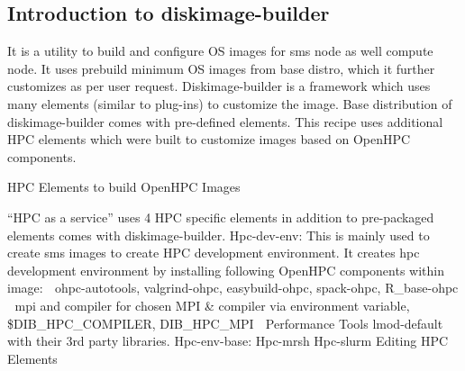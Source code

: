 \documentclass[12pt]{article}
\begin{document}
\subsection{Introduction to diskimage-builder}

It is a utility to build and configure OS images for sms node as well compute node. It uses prebuild minimum OS images from base distro, which it further customizes as per user request. Diskimage-builder is a framework which uses many elements (similar to plug-ins) to customize the image. Base distribution of diskimage-builder comes with pre-defined elements. This recipe uses additional HPC elements which were built to customize images based on OpenHPC components.

HPC Elements to build OpenHPC Images

“HPC as a service” uses 4 HPC specific elements in addition to pre-packaged elements comes with diskimage-builder.
Hpc-dev-env: This is mainly used to create sms images to create HPC development environment. It creates hpc development environment by installing following OpenHPC components within image: 
	ohpc-autotools, valgrind-ohpc, easybuild-ohpc, spack-ohpc, R\_base-ohpc
	mpi and compiler for chosen MPI \& compiler via environment variable, \$DIB\_HPC\_COMPILER, DIB\_HPC\_MPI
	Performance Tools lmod-default with their 3rd party libraries.
Hpc-env-base: 
Hpc-mrsh
Hpc-slurm
Editing HPC Elements
\end{document}
